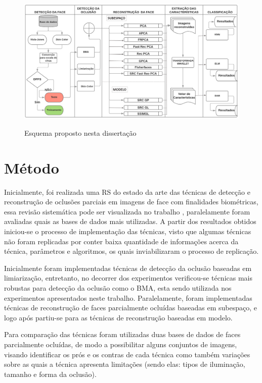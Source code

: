 \begin{figure}[H]
\centering
\caption{Esquema proposto nesta dissertação}
\includegraphics[scale = 0.35]{imgs2/esquema_dissertacao}
\label{fig:escopo_dissertacao}
\end{figure}



\section{Método}

Inicialmente, foi realizada uma RS do estado da arte das técnicas de detecção e reconstrução de oclusões parciais em imagens de face com finalidades biométricas, essa revisão sistemática pode ser visualizada no trabalho \cite{Targino2018_wvc}, paralelamente foram avaliadas quais as bases de dados mais utilizadas. A partir dos resultados obtidos iniciou-se o processo de implementação das técnicas, visto que algumas técnicas não foram replicadas por conter baixa quantidade de informações acerca da técnica, parâmetros e algoritmos, os quais inviabilizaram o processo de replicação.

Inicialmente foram implementadas técnicas de detecção da oclusão baseadas  em limiarização, entretanto, no decorrer dos experimentos verificou-se técnicas mais robustas para detecção da oclusão como o BMA, esta sendo utilizada nos experimentos apresentados neste trabalho. Paralelamente, foram implementadas técnicas de reconstrução de faces parcialmente ocluídas baseadas em subespaço, e logo após partiu-se para as técnicas de reconstrução baseadas em modelo.

Para comparação das técnicas foram utilizadas duas bases de dados de faces parcialmente ocluídas, de modo a possibilitar alguns conjuntos de imagens, visando identificar os prós e os contras de cada técnica como também variações sobre as quais a técnica apresenta limitações (sendo elas: tipos de iluminação, tamanho e forma da oclusão).


